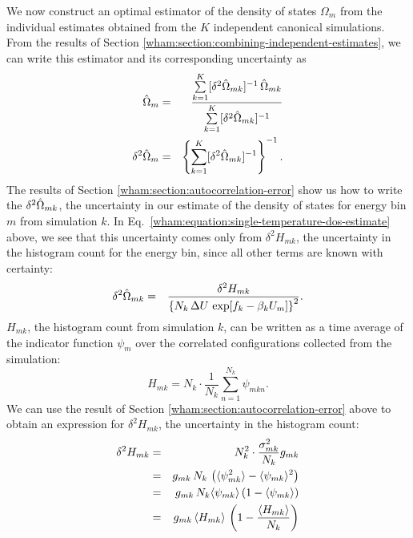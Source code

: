 We now construct an optimal estimator of the density of states $\Omega_m$ from the individual estimates obtained from the $K$ independent canonical simulations.  From the results of Section \ref{wham:section:combining-independent-estimates}, we can write this estimator and its corresponding uncertainty as
\begin{eqnarray} 
\hat{\Omega}_m &=& \frac{\sum\limits_{k=1}^K [\delta^2 \hat{\Omega}_{mk}]^{-1} \, \hat{\Omega}_{mk}}{\sum\limits_{k=1}^K [\delta^2 \hat{\Omega}_{mk}]^{-1}} \label{wham:equation:optimal-dos-combination} \\ 
\delta^2 \hat{\Omega}_m &=& \left\{ \sum_{k = 1}^K [\delta^2 \hat{\Omega}_{mk}]^{-1} \right\}^{-1} .
\end{eqnarray}
The results of Section \ref{wham:section:autocorrelation-error} show us how to write the $\delta^2 \hat{\Omega}_{mk}$, the uncertainty in our estimate of the density of states for energy bin $m$ from simulation $k$.  In Eq.\ \ref{wham:equation:single-temperature-dos-estimate} above, we see that this uncertainty comes only from $\delta^2 H_{mk}$, the uncertainty in the histogram count for the energy bin, since all other terms are known with certainty:
\begin{eqnarray}   
\delta^2 \hat{\Omega}_{mk} &=& \frac{\delta^2 H_{mk}}{\left\{ N_k \, \Delta U \, \exp[f_k - \beta_k U_m] \right\}^2} . \label{wham:equation:single-temperature-dos-error-intermediate}
\end{eqnarray}
$H_{mk}$, the histogram count from simulation $k$, can be written as a time average of the indicator function $\psi_m$ over the correlated configurations collected from the simulation:
\begin{equation}
H_{mk} = N_k \cdot \frac{1}{N_k} \sum_{n=1}^{N_k} \psi_{mkn} .
\end{equation}
We can use the result of Section \ref{wham:section:autocorrelation-error} above to obtain an expression for $\delta^2 H_{mk}$, the uncertainty in the histogram count:
\begin{eqnarray}
\delta^2 H_{mk} &=& N_k^2 \cdot \frac{\sigma^2_{mk}}{N_k} g_{mk} \nonumber \\
&=& g_{mk} \, N_k \, \left( \langle \psi_{mk}^2 \rangle - \langle \psi_{mk} \rangle^2 \right) \nonumber \\
&=& g_{mk} \, N_k \langle \psi_{mk} \rangle \left( 1 - \langle \psi_{mk} \rangle \right) \nonumber \\
&=& g_{mk} \, \langle H_{mk} \rangle \, \left( 1 - \frac{\langle H_{mk} \rangle}{N_k} \right) 
\end{eqnarray}
